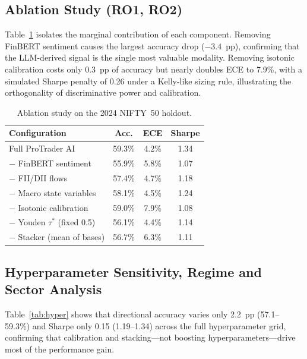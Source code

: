 \documentclass[12pt,a4paper]{article}
\begin{document}
\subsection{Ablation Study (RO1, RO2)}

Table~\ref{tab:ablation} isolates the marginal contribution of each component.
Removing FinBERT sentiment causes the largest accuracy drop ($-3.4$~pp), confirming
that the LLM-derived signal is the single most valuable modality. Removing
isotonic calibration costs only 0.3~pp of accuracy but nearly doubles ECE to 7.9\%,
with a simulated Sharpe penalty of 0.26 under a Kelly-like sizing rule,
illustrating the orthogonality of discriminative power and calibration.

\begin{table}[h]
\centering
\caption{Ablation study on the 2024 NIFTY~50 holdout.}
\label{tab:ablation}
\footnotesize
\begin{tabular}{lccc}
\toprule
\textbf{Configuration} & \textbf{Acc.} & \textbf{ECE} & \textbf{Sharpe} \\
\midrule
Full ProTrader AI            & 59.3\% & 4.2\% & 1.34 \\
$-$ FinBERT sentiment        & 55.9\% & 5.8\% & 1.07 \\
$-$ FII/DII flows            & 57.4\% & 4.7\% & 1.18 \\
$-$ Macro state variables    & 58.1\% & 4.5\% & 1.24 \\
$-$ Isotonic calibration     & 59.0\% & 7.9\% & 1.08 \\
$-$ Youden $\tau^*$ (fixed 0.5) & 56.1\% & 4.4\% & 1.14 \\
$-$ Stacker (mean of bases)  & 56.7\% & 6.3\% & 1.11 \\
\bottomrule
\end{tabular}
\end{table}

\subsection{Hyperparameter Sensitivity, Regime and Sector Analysis}

Table~\ref{tab:hyper} shows that directional accuracy varies only 2.2~pp (57.1--59.3\%)
and Sharpe only 0.15 (1.19--1.34) across the full hyperparameter grid, confirming
that calibration and stacking---not boosting hyperparameters---drive most of the
performance gain.
\end{document}
